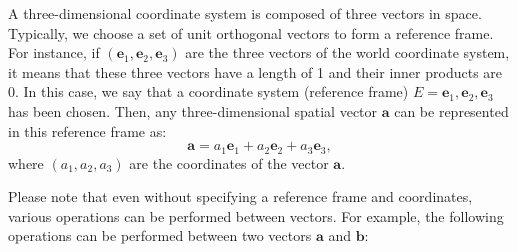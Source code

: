 A three-dimensional coordinate system is composed of three vectors in space. Typically, we choose a set of unit orthogonal vectors to form a reference frame. For instance, if $(\mathbf{e}_1, \mathbf{e}_2, \mathbf{e}_3)$ are the three vectors of the world coordinate system, it means that these three vectors have a length of 1 and their inner products are 0. In this case, we say that a coordinate system (reference frame) $E={\mathbf{e}_1, \mathbf{e}_2, \mathbf{e}_3}$ has been chosen. Then, any three-dimensional spatial vector $\mathbf{a}$ can be represented in this reference frame as:
\begin{equation}
	\mathbf{a} = a_1 \mathbf{e}_1 + a_2 \mathbf{e}_2 + a_3\mathbf{e}_3,
\end{equation}
where $(a_1, a_2, a_3)$ are the coordinates of the vector $\mathbf{a}$.

Please note that even without specifying a reference frame and coordinates, various operations can be performed between vectors. For example, the following operations can be performed between two vectors $\mathbf{a}$ and $\mathbf{b}$:

